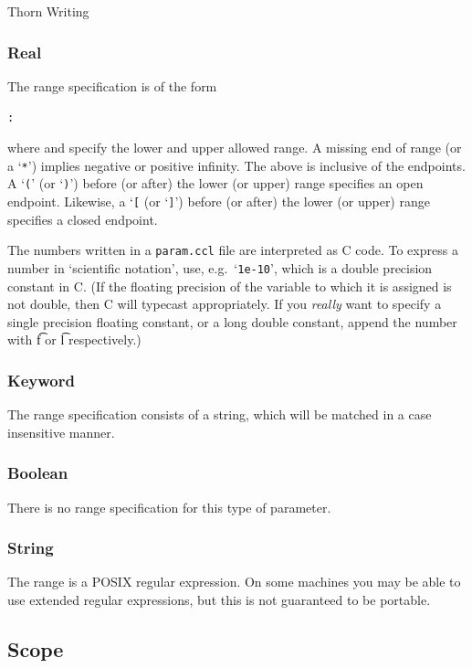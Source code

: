 \begin{cactuspart}{Thorn Writing}
\subsubsection{Real}

The range specification is of the form
\begin{alltt}
:
\end{alltt}
where  and  specify the lower and upper allowed
range.  A missing end of range (or a `\texttt{*}') implies negative or positive
infinity.  The above is inclusive of the endpoints.
A `\texttt{(}' (or `\texttt{)}') before (or after) the lower (or upper) range specifies an open
endpoint.
Likewise, a `\texttt{[} (or `\texttt{]}') before (or after) the lower
(or upper) range specifies a closed endpoint.

The numbers written in a \texttt{param.ccl} file are interpreted as C code.
To express a number in `scientific notation', use,
e.g.\ `\texttt{1e-10}', which is a double precision constant in C.  (If the
floating precision of the variable to which it is assigned is not
double, then C will typecast appropriately.  If you \emph{really} want to
specify a single precision floating constant, or a long double
constant, append the number with {\t f} or {\t l} respectively.)

\subsubsection{Keyword}

The range specification consists of a string, which will be matched in
a case insensitive manner.

\subsubsection{Boolean}

There is no range specification for this type of parameter.

\subsubsection{String}

The range is a POSIX regular expression.  On some machines you may be
able to use extended regular expressions, but this is not guaranteed
to be portable.


\subsection{Scope}
\label{sec:Cactus_parameters.scope}


\end{cactuspart}
